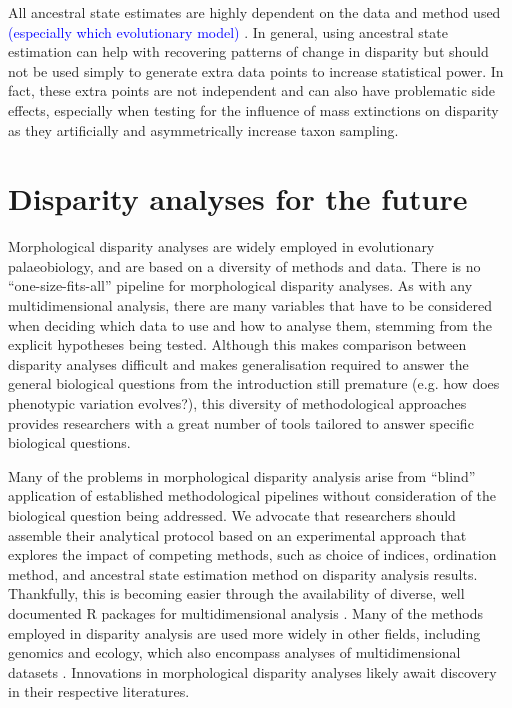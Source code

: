 \documentclass[12pt,letterpaper]{article}
\begin{document}
All ancestral state estimates are highly dependent on the data and method used \textcolor{blue}{(especially which evolutionary model)} \cite{louca2020}.
In general, using ancestral state estimation can help with recovering patterns of change in disparity but should not be used simply to generate extra data points to increase statistical power.
In fact, these extra points are not independent and can also have problematic side effects, especially when testing for the influence of mass extinctions on disparity as they artificially and asymmetrically increase taxon sampling.

\section{Disparity analyses for the future} \label{section:future}

\noindent Morphological disparity analyses are widely employed in evolutionary palaeobiology, and are based on a diversity of methods and data.
There is no ``one-size-fits-all'' pipeline for morphological disparity analyses.
As with any multidimensional analysis, there are many variables that have to be considered when deciding which data to use and how to analyse them, stemming from the explicit hypotheses being tested.
Although this makes comparison between disparity analyses difficult and makes generalisation required to answer the general biological questions from the introduction still premature (e.g. how does phenotypic variation evolves?), this diversity of methodological approaches provides researchers with a great number of tools tailored to answer specific biological questions.

Many of the problems in morphological disparity analysis arise from ``blind'' application of established methodological pipelines without consideration of the biological question being addressed.
We advocate that researchers should assemble their analytical protocol based on an experimental approach that explores the impact of competing methods, such as choice of indices, ordination method, and ancestral state estimation method on disparity analysis results.
Thankfully, this is becoming easier through the availability of diverse, well documented R packages for multidimensional analysis \citep{Bouxin2005, oksanen2007vegan, Harmon2008, lloyd2016, Guillerme2018b}.
Many of the methods employed in disparity analysis are used more widely in other fields, including genomics and ecology, which also encompass analyses of multidimensional datasets \citep{Donohue2013, Saupe2015, Canter2018, mammola2019}.
Innovations in morphological disparity analyses likely await discovery in their respective literatures.
\end{document}

